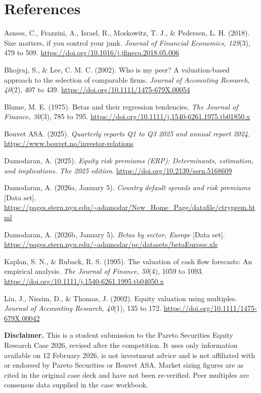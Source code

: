 \documentclass[10pt,a4paper]{article}
\begin{document}
\section*{References}
\small
\begin{list}{}{\leftmargin=12pt \itemindent=-12pt \itemsep=2pt \parsep=0pt}
\item Asness, C., Frazzini, A., Israel, R., Moskowitz, T. J., \& Pedersen, L. H. (2018). Size matters, if you control your junk. \textit{Journal of Financial Economics, 129}(3), 479 to 509. \url{https://doi.org/10.1016/j.jfineco.2018.05.006}
\item Bhojraj, S., \& Lee, C. M. C. (2002). Who is my peer? A valuation-based approach to the selection of comparable firms. \textit{Journal of Accounting Research, 40}(2), 407 to 439. \url{https://doi.org/10.1111/1475-679X.00054}
\item Blume, M. E. (1975). Betas and their regression tendencies. \textit{The Journal of Finance, 30}(3), 785 to 795. \url{https://doi.org/10.1111/j.1540-6261.1975.tb01850.x}
\item Bouvet ASA. (2025). \textit{Quarterly reports Q1 to Q3 2025 and annual report 2024}. \url{https://www.bouvet.no/investor-relations}
\item Damodaran, A. (2025). \textit{Equity risk premiums (ERP): Determinants, estimation, and implications. The 2025 edition}. \url{https://doi.org/10.2139/ssrn.5168609}
\item Damodaran, A. (2026a, January 5). \textit{Country default spreads and risk premiums} [Data set]. \url{https://pages.stern.nyu.edu/~adamodar/New_Home_Page/datafile/ctryprem.html}
\item Damodaran, A. (2026b, January 5). \textit{Betas by sector, Europe} [Data set]. \url{https://pages.stern.nyu.edu/~adamodar/pc/datasets/betaEurope.xls}
\item Kaplan, S. N., \& Ruback, R. S. (1995). The valuation of cash flow forecasts: An empirical analysis. \textit{The Journal of Finance, 50}(4), 1059 to 1093. \url{https://doi.org/10.1111/j.1540-6261.1995.tb04050.x}
\item Liu, J., Nissim, D., \& Thomas, J. (2002). Equity valuation using multiples. \textit{Journal of Accounting Research, 40}(1), 135 to 172. \url{https://doi.org/10.1111/1475-679X.00042}
\end{list}

\vspace{6pt}
{\footnotesize\color{ink2}\textbf{Disclaimer.} This is a student submission to the Pareto Securities Equity Research Case 2026, revised after the competition. It uses only information available on 12 February 2026, is not investment advice and is not affiliated with or endorsed by Pareto Securities or Bouvet ASA. Market sizing figures are as cited in the original case deck and have not been re-verified. Peer multiples are consensus data supplied in the case workbook.}
\end{document}
